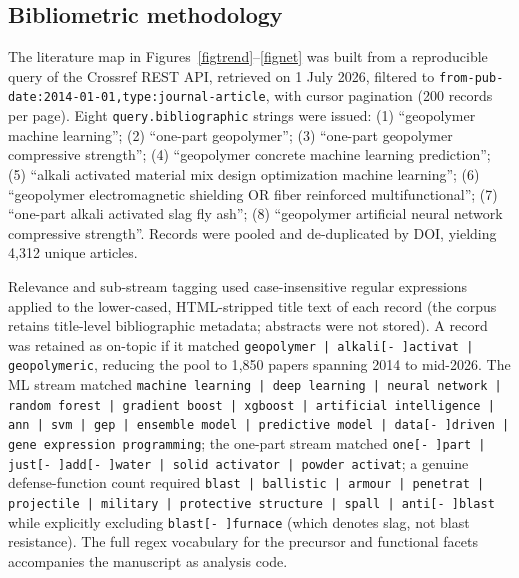 \documentclass[materials,article,submit,pdftex,moreauthors]{Definitions/mdpi}
\begin{document}
\subsection{Bibliometric methodology}\label{sec:bibmethod}

\sloppy
The literature map in Figures~\ref{figtrend}--\ref{fignet} was built from a reproducible query of the Crossref REST API, retrieved on 1 July 2026, filtered to \texttt{from-pub-date:2014-01-01,type:journal-article}, with cursor pagination (200 records per page). Eight \texttt{query.bibliographic} strings were issued: (1) ``geopolymer machine learning''; (2) ``one-part geopolymer''; (3) ``one-part geopolymer compressive strength''; (4) ``geopolymer concrete machine learning prediction''; (5) ``alkali activated material mix design optimization machine learning''; (6) ``geopolymer electromagnetic shielding OR fiber reinforced multifunctional''; (7) ``one-part alkali activated slag fly ash''; (8) ``geopolymer artificial neural network compressive strength''. Records were pooled and de-duplicated by DOI, yielding 4{,}312 unique articles.

Relevance and sub-stream tagging used case-insensitive regular expressions applied to the lower-cased, HTML-stripped title text of each record (the corpus retains title-level bibliographic metadata; abstracts were not stored). A record was retained as on-topic if it matched \texttt{geopolymer | alkali[- ]activat | geopolymeric}, reducing the pool to 1{,}850 papers spanning 2014 to mid-2026. The ML stream matched \texttt{machine learning | deep learning | neural network | random forest | gradient boost | xgboost | artificial intelligence | ann | svm | gep | ensemble model | predictive model | data[- ]driven | gene expression programming}; the one-part stream matched \texttt{one[- ]part | just[- ]add[- ]water | solid activator | powder activat}; a genuine defense-function count required \texttt{blast | ballistic | armour | penetrat | projectile | military | protective structure | spall | anti[- ]blast} while explicitly excluding \texttt{blast[- ]furnace} (which denotes slag, not blast resistance). The full regex vocabulary for the precursor and functional facets accompanies the manuscript as analysis code.
\end{document}
